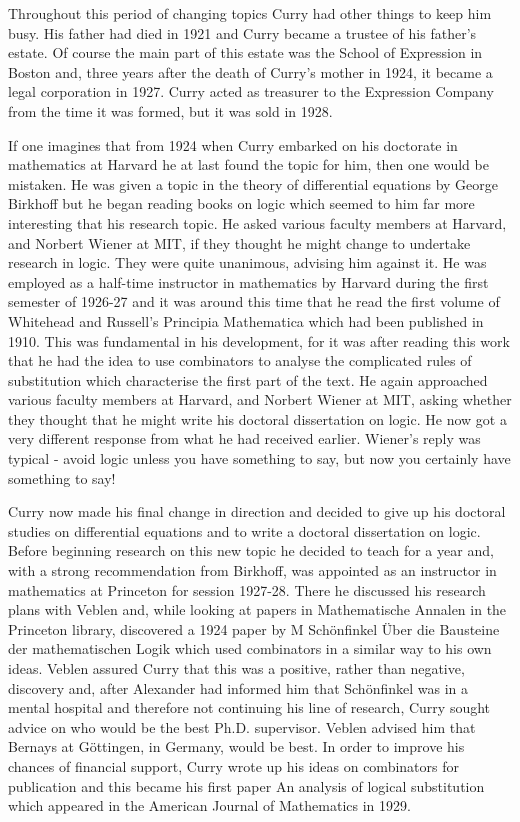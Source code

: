 Throughout this period of changing topics Curry had other things to keep him busy. His father had died in 1921 and Curry became a trustee of his father's estate. Of course the main part of this estate was the School of Expression in Boston and, three years after the death of Curry's mother in 1924, it became a legal corporation in 1927. Curry acted as treasurer to the Expression Company from the time it was formed, but it was sold in 1928.

If one imagines that from 1924 when Curry embarked on his doctorate in mathematics at Harvard he at last found the topic for him, then one would be mistaken. He was given a topic in the theory of differential equations by George Birkhoff but he began reading books on logic which seemed to him far more interesting that his research topic. He asked various faculty members at Harvard, and Norbert Wiener at MIT, if they thought he might change to undertake research in logic. They were quite unanimous, advising him against it. He was employed as a half-time instructor in mathematics by Harvard during the first semester of 1926-27 and it was around this time that he read the first volume of Whitehead and Russell's Principia Mathematica which had been published in 1910. This was fundamental in his development, for it was after reading this work that he had the idea to use combinators to analyse the complicated rules of substitution which characterise the first part of the text. He again approached various faculty members at Harvard, and Norbert Wiener at MIT, asking whether they thought that he might write his doctoral dissertation on logic. He now got a very different response from what he had received earlier. Wiener's reply was typical - avoid logic unless you have something to say, but now you certainly have something to say!

Curry now made his final change in direction and decided to give up his doctoral studies on differential equations and to write a doctoral dissertation on logic. Before beginning research on this new topic he decided to teach for a year and, with a strong recommendation from Birkhoff, was appointed as an instructor in mathematics at Princeton for session 1927-28. There he discussed his research plans with Veblen and, while looking at papers in Mathematische Annalen in the Princeton library, discovered a 1924 paper by M Schönfinkel Über die Bausteine der mathematischen Logik which used combinators in a similar way to his own ideas. Veblen assured Curry that this was a positive, rather than negative, discovery and, after Alexander had informed him that Schönfinkel was in a mental hospital and therefore not continuing his line of research, Curry sought advice on who would be the best Ph.D. supervisor. Veblen advised him that Bernays at Göttingen, in Germany, would be best. In order to improve his chances of financial support, Curry wrote up his ideas on combinators for publication and this became his first paper An analysis of logical substitution which appeared in the American Journal of Mathematics in 1929.

